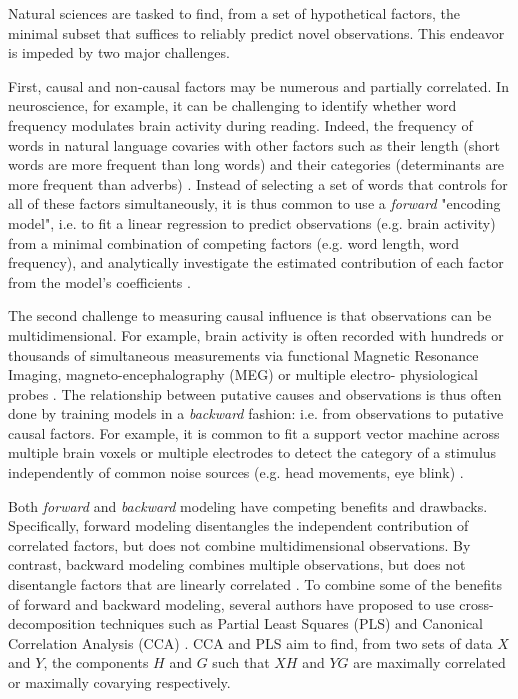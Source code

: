 Natural sciences are tasked to find, from a set of hypothetical factors, the
minimal subset that suffices to reliably predict novel observations. This
endeavor is impeded by two major challenges.

First, causal and non-causal factors may be numerous and partially correlated.
In neuroscience, for
example, it can be challenging to identify whether word frequency modulates
brain activity during reading. Indeed, the
frequency of words in natural language covaries with other factors such as their
length (short words are more frequent than long words) and their categories
(determinants are more frequent than adverbs)
\citep{kutas2011thirty,pegado2014timing}. Instead of selecting a set of words
that controls for all of these factors simultaneously, it is thus common to use
a \emph{forward} "encoding model", i.e. to fit a linear regression to predict observations
(e.g. brain activity) from a minimal combination of competing factors (e.g.
word length, word frequency), and analytically investigate
the estimated contribution of each factor from the model's coefficients
\citep{friston1994statistical,naselaris2011encoding,weichwald2015causal,
king2018encoding,huth2016natural}.

The second challenge to measuring causal influence is that observations can be
multidimensional.
For example, brain activity is often
recorded with hundreds or thousands of simultaneous measurements via functional
Magnetic Resonance Imaging, magneto-encephalography (MEG) or multiple electro-
physiological probes \citep{friston1994statistical,steinmetz2018challenges}.
The relationship between putative causes and observations is thus often
done by training models in a \emph{backward}
fashion: i.e. from observations to putative causal factors. For example, it is
common to fit a support vector machine across multiple
brain voxels or multiple electrodes to detect the
category of a stimulus independently of common noise sources (e.g. head
movements, eye blink)
\citep{norman2006beyond,cichy2014resolving,
kriegeskorte2008representational, king2018encoding}.

Both \emph{forward} and \emph{backward} modeling have competing benefits and drawbacks.
Specifically, forward modeling disentangles the independent contribution of
correlated factors, but does not combine multidimensional observations. By
contrast, backward modeling combines multiple observations, but does not
disentangle factors that are linearly correlated \citep{weichwald2015causal,
hebart2018deconstructing, king2018encoding}. To combine some of the benefits of forward
and backward modeling, several authors have proposed to use cross-decomposition
techniques such as Partial Least Squares (PLS) and Canonical Correlation
Analysis (CCA) \citep{de2019multiway, bilenko2016pyrcca}. CCA and PLS aim to find, from two sets of
data $X$ and $Y$, the components $H$ and $G$ such that $XH$ and $YG$ are maximally
correlated or maximally covarying respectively.

